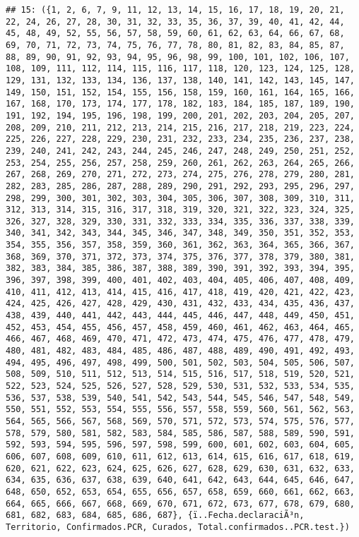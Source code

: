\documentclass[
]{book}
\begin{document}
\begin{verbatim}
## 15: ({1, 2, 6, 7, 9, 11, 12, 13, 14, 15, 16, 17, 18, 19, 20, 21, 22, 24, 26, 27, 28, 30, 31, 32, 33, 35, 36, 37, 39, 40, 41, 42, 44, 45, 48, 49, 52, 55, 56, 57, 58, 59, 60, 61, 62, 63, 64, 66, 67, 68, 69, 70, 71, 72, 73, 74, 75, 76, 77, 78, 80, 81, 82, 83, 84, 85, 87, 88, 89, 90, 91, 92, 93, 94, 95, 96, 98, 99, 100, 101, 102, 106, 107, 108, 109, 111, 112, 114, 115, 116, 117, 118, 120, 123, 124, 125, 128, 129, 131, 132, 133, 134, 136, 137, 138, 140, 141, 142, 143, 145, 147, 149, 150, 151, 152, 154, 155, 156, 158, 159, 160, 161, 164, 165, 166, 167, 168, 170, 173, 174, 177, 178, 182, 183, 184, 185, 187, 189, 190, 191, 192, 194, 195, 196, 198, 199, 200, 201, 202, 203, 204, 205, 207, 208, 209, 210, 211, 212, 213, 214, 215, 216, 217, 218, 219, 223, 224, 225, 226, 227, 228, 229, 230, 231, 232, 233, 234, 235, 236, 237, 238, 239, 240, 241, 242, 243, 244, 245, 246, 247, 248, 249, 250, 251, 252, 253, 254, 255, 256, 257, 258, 259, 260, 261, 262, 263, 264, 265, 266, 267, 268, 269, 270, 271, 272, 273, 274, 275, 276, 278, 279, 280, 281, 282, 283, 285, 286, 287, 288, 289, 290, 291, 292, 293, 295, 296, 297, 298, 299, 300, 301, 302, 303, 304, 305, 306, 307, 308, 309, 310, 311, 312, 313, 314, 315, 316, 317, 318, 319, 320, 321, 322, 323, 324, 325, 326, 327, 328, 329, 330, 331, 332, 333, 334, 335, 336, 337, 338, 339, 340, 341, 342, 343, 344, 345, 346, 347, 348, 349, 350, 351, 352, 353, 354, 355, 356, 357, 358, 359, 360, 361, 362, 363, 364, 365, 366, 367, 368, 369, 370, 371, 372, 373, 374, 375, 376, 377, 378, 379, 380, 381, 382, 383, 384, 385, 386, 387, 388, 389, 390, 391, 392, 393, 394, 395, 396, 397, 398, 399, 400, 401, 402, 403, 404, 405, 406, 407, 408, 409, 410, 411, 412, 413, 414, 415, 416, 417, 418, 419, 420, 421, 422, 423, 424, 425, 426, 427, 428, 429, 430, 431, 432, 433, 434, 435, 436, 437, 438, 439, 440, 441, 442, 443, 444, 445, 446, 447, 448, 449, 450, 451, 452, 453, 454, 455, 456, 457, 458, 459, 460, 461, 462, 463, 464, 465, 466, 467, 468, 469, 470, 471, 472, 473, 474, 475, 476, 477, 478, 479, 480, 481, 482, 483, 484, 485, 486, 487, 488, 489, 490, 491, 492, 493, 494, 495, 496, 497, 498, 499, 500, 501, 502, 503, 504, 505, 506, 507, 508, 509, 510, 511, 512, 513, 514, 515, 516, 517, 518, 519, 520, 521, 522, 523, 524, 525, 526, 527, 528, 529, 530, 531, 532, 533, 534, 535, 536, 537, 538, 539, 540, 541, 542, 543, 544, 545, 546, 547, 548, 549, 550, 551, 552, 553, 554, 555, 556, 557, 558, 559, 560, 561, 562, 563, 564, 565, 566, 567, 568, 569, 570, 571, 572, 573, 574, 575, 576, 577, 578, 579, 580, 581, 582, 583, 584, 585, 586, 587, 588, 589, 590, 591, 592, 593, 594, 595, 596, 597, 598, 599, 600, 601, 602, 603, 604, 605, 606, 607, 608, 609, 610, 611, 612, 613, 614, 615, 616, 617, 618, 619, 620, 621, 622, 623, 624, 625, 626, 627, 628, 629, 630, 631, 632, 633, 634, 635, 636, 637, 638, 639, 640, 641, 642, 643, 644, 645, 646, 647, 648, 650, 652, 653, 654, 655, 656, 657, 658, 659, 660, 661, 662, 663, 664, 665, 666, 667, 668, 669, 670, 671, 672, 673, 677, 678, 679, 680, 681, 682, 683, 684, 685, 686, 687}, {ï..Fecha.declaraciÃ³n, Territorio, Confirmados.PCR, Curados, Total.confirmados..PCR.test.})

\end{verbatim}
\end{document}
